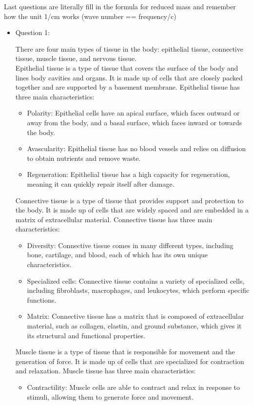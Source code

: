 \documentclass{article}
\begin{document}
Last questions are literally fill in the formula for reduced mass and remember how the unit 1/cm works (wave number == frequency/c)



\begin{itemize}
    \item Question 1:
    
There are four main types of tissue in the body: epithelial tissue, connective tissue, muscle tissue, and nervous tissue.\\

Epithelial tissue is a type of tissue that covers the surface of the body and lines body cavities and organs. It is made up of cells that are closely packed together and are supported by a basement membrane. Epithelial tissue has three main characteristics:\\
\begin{itemize}
\item Polarity: Epithelial cells have an apical surface, which faces outward or away from the body, and a basal surface, which faces inward or towards the body.

\item Avascularity: Epithelial tissue has no blood vessels and relies on diffusion to obtain nutrients and remove waste.

\item Regeneration: Epithelial tissue has a high capacity for regeneration, meaning it can quickly repair itself after damage.
\end{itemize}
Connective tissue is a type of tissue that provides support and protection to the body. It is made up of cells that are widely spaced and are embedded in a matrix of extracellular material. Connective tissue has three main characteristics:\\
\begin{itemize}
\item Diversity: Connective tissue comes in many different types, including bone, cartilage, and blood, each of which has its own unique characteristics.

\item Specialized cells: Connective tissue contains a variety of specialized cells, including fibroblasts, macrophages, and leukocytes, which perform specific functions.

\item Matrix: Connective tissue has a matrix that is composed of extracellular material, such as collagen, elastin, and ground substance, which gives it its structural and functional properties.
\end{itemize}
Muscle tissue is a type of tissue that is responsible for movement and the generation of force. It is made up of cells that are specialized for contraction and relaxation. Muscle tissue has three main characteristics:\\
\begin{itemize}
\item Contractility: Muscle cells are able to contract and relax in response to stimuli, allowing them to generate force and movement.


\end{itemize}
\end{itemize}
\end{document}

